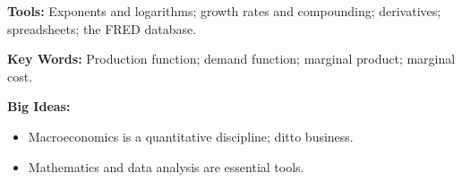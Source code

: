\textbf{Tools:} Exponents and logarithms; growth rates and compounding; derivatives; spreadsheets; the FRED database.

\textbf{Key Words:} Production function; demand function; 
marginal product; marginal cost.

\textbf{Big Ideas:}
\begin{itemize}
    \item  Macroeconomics is a quantitative discipline; ditto business.
    \item  Mathematics and data analysis are essential tools.
\end{itemize}
